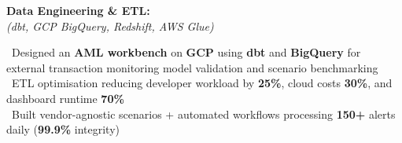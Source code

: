 \documentclass[11pt,a4paper]{article}
\begin{document}
\begin{minipage}{\textwidth}
\begin{minipage}[t]{\textwidth-19pt}
\noindent\begin{minipage}[t]{0.28\textwidth}
\textbf{\color{headerblue}Data Engineering \& ETL:}\\[0pt]
\textit{(dbt, GCP BigQuery, Redshift, AWS Glue)}
\end{minipage}%
\hfill%
\begin{minipage}[t]{0.68\textwidth}
\textbullet\ Designed an \textbf{AML workbench} on \textbf{GCP} using \textbf{dbt} and \textbf{BigQuery} for external transaction monitoring model validation and scenario benchmarking\\[2pt]
\textbullet\ ETL optimisation reducing developer workload by \textbf{25\%}, cloud costs \textbf{30\%}, and dashboard runtime \textbf{70\%}\\[2pt]
\textbullet\ Built vendor-agnostic scenarios + automated workflows processing \textbf{150+} alerts daily (\textbf{99.9\%} integrity)
\end{minipage}

\end{minipage}
\end{minipage}

\vspace{6pt}
\end{document}

